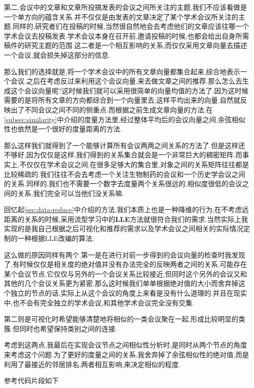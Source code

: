 第二,会议中的文章和文章所投搞发表的会议之间所关注的主题,我们不应该看做是一个单方向的蕴含关系.并不仅仅是由发表的文章决定了某个学术会议所关注的主题.同样的,研究者们在投稿的时候,当然很自然地会去考虑他们的文章应该往哪一个学术会议去投稿发表.学术会议本身在召开前,邀请投稿的时候,也都会给出自身所需稿件的研究主题的范围.这二者是一个相互影响的关系,而仅仅采用文章向量去描述一个会议,就会损失掉这部分的信息.

那么我们的选择就是,将一个学术会议中的所有文章向量都集合起来,综合地表示一个会议.之后在考虑反过来利用这个会议向量,来去做文章之间的推荐.那么怎么去生成这个会议向量呢?这时候我们就可以采用很简单的向量均值的方法了.因为这时候需要的是将所有文章的方向都综合到一个向量里去,这样平均出来的向量,自然就反映出了不同会议之间不同的侧重点.而根据之前生成文章向量的方法,在\ref{subsec:similarity}中介绍的度量方法里,经过整体平均后的会议向量之间,余弦相似性也依然是一个很好的度量距离的方法.

那么这样我们就得到了一个能够计算所有会议两两之间关系的方法了.但是这样还不够好,因为仅仅是这样,我们得到的关系集合就会是一个非常巨大的稠密矩阵.而事实上,不仅仅在学术会议之间,在很多足够大的集合里,对象之间的关系矩阵往往都是比较稀疏的.我们往往不会去考虑一个关注生物制药的会议和一个历史学会议之间的关系.同样的,我们也不需要一个数字去度量两个关系很远的,相似度很低的会议之间的关系,我们完全可以当他们没关系嘛.

回忆起\ref{sec:data-reduce}中介绍的方法,我们本质上也是一种降维的行为,在不考虑远距离的关系的时候,采用流型学习中的\textbf{LLE}方法就很符合我们的需求.当然实际上我实现的是我自己根据之后可视化和推荐的需求以及学术会议之间相关的实际情况定制的一种根据LLE改编的算法.

这么做的原因同样有两个.第一是在进行对前一步得到的会议向量的检查时我发现了,有时候仅仅是相关度的绝对值并没有办法完全的反映两者之间的关系,可能存在某个会议节点,它仅仅与另外的一个会议关系比较接近,但同时这个另外的会议又和其他的几个会议关系更为紧密,那么这时候我们单单根据绝对值的大小而舍弃掉这个独立的节点的话,实际上从这个会议的角度上来看是没有什么道理的.并且在现实中,也不会有完全独立的学术会议,和其他学术会议完全没有交集.

第二则是可视化时希望能够清楚地将相似的一类会议聚在一起,形成比较明显的类簇.但同时也希望保持类别之间的连接.

考虑到这两点,我最后在实现会议节点之间相似性分析时,是同时从两个节点的角度来考虑这个问题.为了更好的度量之间的关系,我舍弃掉了余弦相似性的绝对值,而是利用了最接近的邻居排名,两者相互影响,来决定相似的程度.

参考代码片段如下

